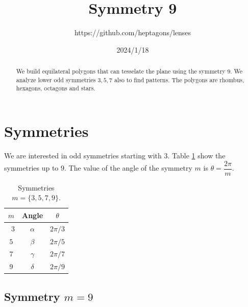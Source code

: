 \documentclass[11pt]{article}
\title{Symmetry 9}
\author{https://github.com/heptagons/lenses}
\date{2024/1/18}
\begin{document}
\maketitle
\begin{abstract}
We build equilateral polygons that can tesselate the plane using the symmetry $9$. We analyze lower odd symmetries $3,5,7$ also to find patterns. The polygons are rhombus, hexagons, octagons and stars.
\end{abstract}

\section{Symmetries}

We are interested in odd symmetries starting with $3$. Table \ref{tbl:symm} show the symmetries up to $9$. The value of the angle of the symmetry $m$ is $\theta = \dfrac{2\pi}m$. 

\begin{table}[H]
\begin{center}
\begin{tabular}{|c|c c|}
\hline
$m$ & Angle & $\theta$ \\ \hline\
$3$ & $\alpha$ & $2\pi/3$ \\ \hline
$5$ & $\beta$  & $2\pi/5$ \\ \hline
$7$ & $\gamma$ & $2\pi/7$ \\ \hline
$9$ & $\delta$ & $2\pi/9$ \\ \hline
\end{tabular}
\caption{Symmetries $m=\{3,5,7,9\}$.} 
\label{tbl:symm}
\end{center}
\end{table}

\subsection{Symmetry $m=9$}
\end{document}
